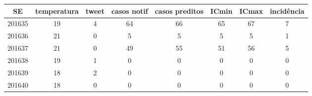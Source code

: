 \begin{tabular}{c|ccccccc}
  \hline
SE & temperatura & tweet & casos notif & casos preditos & ICmin & ICmax & incidência \\ 
  \hline
201635 & 19 & 4 & 64 & 66 & 65 & 67 & 7 \\ 
  201636 & 21 & 0 & 5 & 5 & 5 & 5 & 1 \\ 
  201637 & 21 & 0 & 49 & 55 & 51 & 56 & 5 \\ 
  201638 & 19 & 1 & 0 & 0 & 0 & 0 & 0 \\ 
  201639 & 18 & 2 & 0 & 0 & 0 & 0 & 0 \\ 
  201640 & 18 & 0 & 0 & 0 & 0 & 0 & 0 \\ 
   \hline
\end{tabular}
